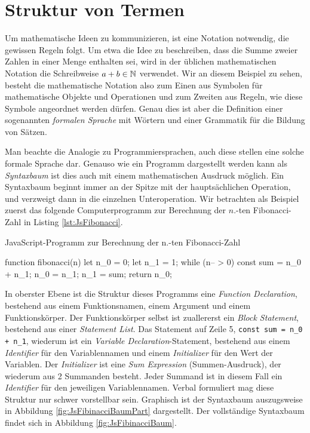 \section{Struktur von Termen}

Um mathematische Ideen zu kommunizieren, ist eine Notation notwendig, die gewissen Regeln folgt. Um etwa die Idee zu beschreiben, dass die Summe zweier Zahlen in einer Menge enthalten sei, wird in der üblichen mathematischen Notation die Schreibweise $a+b\in\mathbb{N}$ verwendet. Wir an diesem Beispiel zu sehen, besteht die mathematische Notation also zum Einen aus Symbolen für mathematische Objekte und Operationen und zum Zweiten aus Regeln, wie diese Symbole angeordnet werden dürfen. Genau dies ist aber die Definition einer sogenannten \emph{formalen Sprache} mit Wörtern und einer Grammatik für die Bildung von Sätzen.

Man beachte die Analogie zu Programmiersprachen, auch diese stellen eine solche formale Sprache dar. Genauso wie ein Programm dargestellt werden kann als \emph{Syntaxbaum} ist dies auch mit einem mathematischen Ausdruck möglich. Ein Syntaxbaum beginnt immer an der Spitze mit der hauptsächlichen Operation, und verzweigt dann in die einzelnen Unteroperation. Wir betrachten als Beispiel zuerst das folgende Computerprogramm zur Berechnung der $n$.-ten Fibonacci-Zahl in Listing \ref{lst:JsFibonacci}.

\begin{listing}[H]
\caption{JavaScript-Programm zur Berechnung der n.-ten Fibonacci-Zahl}
\label{lst:JsFibonacci}
\begin{jscode}
function fibonacci(n) {
	let n_0 = 0;
	let n_1 = 1;
	while (n-- > 0) {
		const sum = n_0 + n_1;
		n_0 = n_1;
		n_1 = sum;
	}
	return n_0;
}
\end{jscode}
\end{listing}	


In oberster Ebene ist die Struktur dieses Programms eine \emph{Function Declaration}, bestehend aus einem Funktionsnamen, einem Argument und einem Funktionskörper. Der Funktionskörper selbst ist zuallererst ein \emph{Block Statement}, bestehend aus einer \emph{Statement List}. Das Statement auf Zeile 5, \lstinline{const sum = n_0 + n_1}, wiederum ist ein \emph{Variable Declaration}-Statement, bestehend aus einem \emph{Identifier} für den Variablennamen und einem \emph{Initializer} für den Wert der Variablen. Der \emph{Initializer} ist eine \emph{Sum Expression} (Summen-Ausdruck), der wiederum aus 2 Summanden besteht. Jeder Summand ist in diesem Fall ein \emph{Identifier} für den jeweiligen Variablennamen. Verbal formuliert mag diese Struktur nur schwer vorstellbar sein. Graphisch ist der Syntaxbaum auszugsweise in Abbildung \ref{fig:JsFibinacciBaumPart} dargestellt. Der vollständige Syntaxbaum findet sich in Abbildung \ref{fig:JsFibinacciBaum}.


